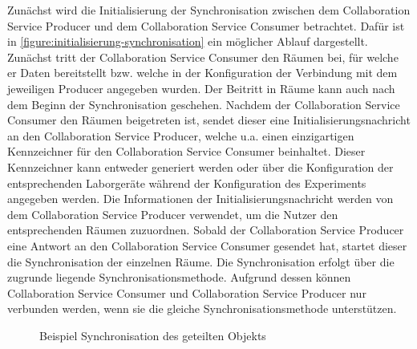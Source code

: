 Zunächst wird die Initialisierung der Synchronisation zwischen dem Collaboration Service Producer und dem Collaboration Service Consumer betrachtet. Dafür ist in \autoref{figure:initialisierung-synchronisation} ein möglicher Ablauf dargestellt. Zunächst tritt der Collaboration Service Consumer den Räumen bei, für welche er Daten bereitstellt bzw. welche in der Konfiguration der Verbindung mit dem jeweiligen Producer angegeben wurden. Der Beitritt in Räume kann auch nach dem Beginn der Synchronisation geschehen. Nachdem der Collaboration Service Consumer den Räumen beigetreten ist, sendet dieser eine Initialisierungsnachricht an den Collaboration Service Producer, welche u.a. einen einzigartigen Kennzeichner für den Collaboration Service Consumer beinhaltet. Dieser Kennzeichner kann entweder generiert werden oder über die Konfiguration der entsprechenden Laborgeräte während der Konfiguration des Experiments angegeben werden. Die Informationen der Initialisierungsnachricht werden von dem Collaboration Service Producer verwendet, um die Nutzer den entsprechenden Räumen zuzuordnen. Sobald der Collaboration Service Producer eine Antwort an den Collaboration Service Consumer gesendet hat, startet dieser die Synchronisation der einzelnen Räume. Die Synchronisation erfolgt über die zugrunde liegende Synchronisationsmethode. Aufgrund dessen können Collaboration Service Consumer und Collaboration Service Producer nur verbunden werden, wenn sie die gleiche Synchronisationsmethode unterstützen.

\begin{figure}[tbp]
    \centering

    \caption{Beispiel Synchronisation des geteilten Objekts}
    \label{figure:synchronisation-des-geteilten-objekts}
\end{figure}

